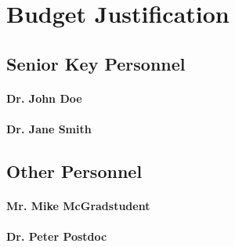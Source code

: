 

\section{Budget Justification}
\subsection{Senior Key Personnel}
\paragraph{Dr. John Doe} \lipsum[1-1]
\paragraph{Dr. Jane Smith} \lipsum[2-2]

\subsection{Other Personnel}
\paragraph{Mr. Mike McGradstudent} \lipsum[3-3]
\paragraph{Dr. Peter Postdoc} \lipsum[4-4]